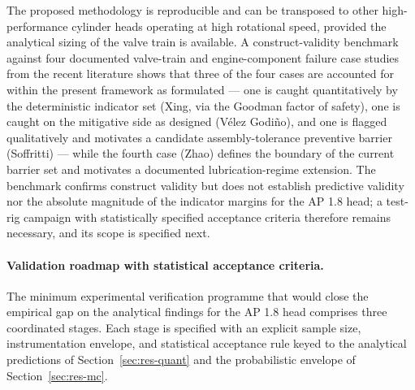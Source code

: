 The proposed methodology is reproducible and can be transposed to
other high-performance cylinder heads operating at high rotational
speed, provided the analytical sizing of the valve train is
available. A construct-validity benchmark against four documented
valve-train and engine-component failure case studies from the recent
literature \citep{velezgodino2019overheadvalvetrain,soffritti2018wornvalvetrain,xing2021valvespringEAC,zhao2023camshaftV6}
shows that three of the four cases are accounted for within the
present framework as formulated --- one is caught quantitatively by
the deterministic indicator set (Xing, via the Goodman factor of
safety), one is caught on the mitigative side as designed
(V\'elez Godi\~no), and one is flagged qualitatively and motivates a
candidate assembly-tolerance preventive barrier (Soffritti) --- while
the fourth case (Zhao) defines the boundary of the current barrier
set and motivates a documented lubrication-regime extension. The
benchmark confirms construct validity but does not establish
predictive validity nor the absolute magnitude of the indicator
margins for the AP 1.8 head; a test-rig campaign with statistically
specified acceptance criteria therefore remains necessary, and its
scope is specified next.

\paragraph{Validation roadmap with statistical acceptance criteria.}
The minimum experimental verification programme that would close the
empirical gap on the analytical findings for the AP 1.8 head
comprises three coordinated stages. Each stage is specified with an
explicit sample size, instrumentation envelope, and statistical
acceptance rule keyed to the analytical predictions of
Section~\ref{sec:res-quant} and the probabilistic envelope of
Section~\ref{sec:res-mc}.

